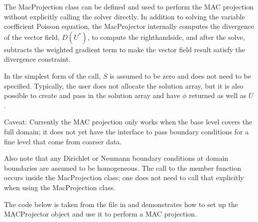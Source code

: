 \documentclass[letterpaper,10pt,english]{sphinxmanual}
\begin{document}
\sphinxAtStartPar
The MacProjection class can be defined and used to perform the MAC projection without explicitly
calling the solver directly.  In addition to solving the variable coefficient Poisson equation,
the MacProjector internally computes the divergence of the vector field, \(D(U^*)\),
to compute the right\sphinxhyphen{}hand\sphinxhyphen{}side, and after the solve, subtracts the weighted gradient term to
make the vector field result satisfy the divergence constraint.

\sphinxAtStartPar
In the simplest form of the call, \(S\) is assumed to be zero and does not need to be specified.
Typically, the user does not allocate the solution array, but it is also possible to create and pass
in the solution array and have \(\phi\) returned as well as \(U\).

\sphinxAtStartPar
Caveat:  Currently the MAC projection only works when the base level covers the full domain; it does
not yet have the interface to pass boundary conditions for a fine level that come from coarser data.

\sphinxAtStartPar
Also note that any Dirichlet or Neumann boundary conditions at domain boundaries
are assumed to be homogeneous.  The call to the  member function
 occurs inside the MacProjection class; one does not need to call that
explicitly when using the MacProjection class.

\sphinxAtStartPar
The code below is taken from the file
 in  and demonstrates how to set up
the MACProjector object and use it to perform a MAC projection.
\end{document}
